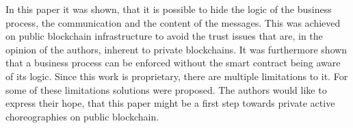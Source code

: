 \documentclass[runningheads]{llncs}
\begin{document}
In this paper it was shown, that it is possible to hide the logic of the business process, the communication and the content of the messages. This was achieved on public blockchain infrastructure to avoid the trust issues that are, in the opinion of the authors, inherent to private blockchains. It was furthermore shown that a business process can be enforced without the smart contract being aware of its logic. Since this work is proprietary, there are multiple limitations to it. For some of these limitations solutions were proposed. The authors would like to express their hope, that this paper might be a first step towards private active choreographies on public blockchain.





\end{document}
